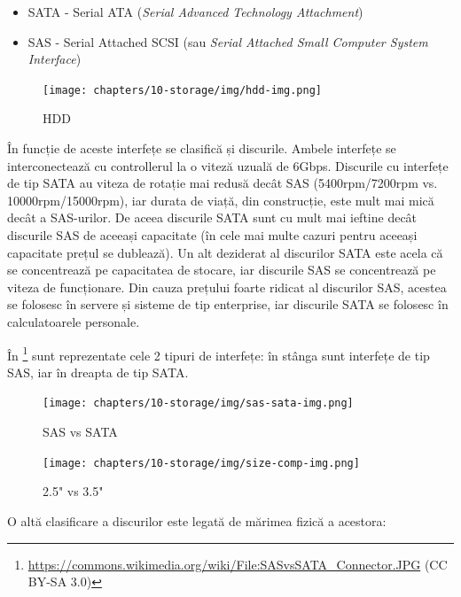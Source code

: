\begin{itemize}
  \item SATA - Serial ATA  (\textit{Serial Advanced Technology Attachment})
  \item SAS - Serial Attached SCSI  (sau \textit{Serial Attached Small Computer System Interface})
\end{itemize}

\begin{figure}[!htbp]
  \centering
  \texttt{[image: chapters/10-storage/img/hdd-img.png]}
  \caption{HDD}
  \label{fig:storage:hdd}
\end{figure}

În funcție de aceste interfețe se clasifică și discurile.
Ambele interfețe se interconectează cu controllerul la o viteză uzuală de 6Gbps.
Discurile cu interfețe de tip SATA au viteza de rotație mai redusă decât SAS (5400rpm/7200rpm vs. 10000rpm/15000rpm), iar durata de viață, din construcție, este mult mai mică decât a SAS-urilor.
De aceea discurile SATA sunt cu mult mai ieftine decât discurile SAS de aceeași capacitate (în cele mai multe cazuri pentru aceeași capacitate prețul se dublează).
Un alt deziderat al discurilor SATA este acela că se concentrează pe capacitatea de stocare, iar discurile SAS se concentrează pe viteza de funcționare.
Din cauza prețului foarte ridicat al discurilor SAS, acestea se folosesc în servere și sisteme de tip enterprise, iar discurile SATA se folosesc în calculatoarele personale.

În \footnote{\url{https://commons.wikimedia.org/wiki/File:SASvsSATA\_Connector.JPG} (CC BY-SA 3.0)} sunt reprezentate cele 2 tipuri de interfețe: în stânga sunt interfețe de tip SAS, iar în dreapta de tip SATA.

\begin{figure}[!htbp]
  \centering
  \texttt{[image: chapters/10-storage/img/sas-sata-img.png]}
  \caption{SAS vs SATA}
  \label{fig:storage:sas-sata}
\end{figure}

\begin{figure}[!htbp]
  \centering
  \texttt{[image: chapters/10-storage/img/size-comp-img.png]}
  \caption{2.5" vs 3.5"}
  \label{fig:storage:size-comp}
\end{figure}

O altă clasificare a discurilor este legată de mărimea fizică a acestora:

